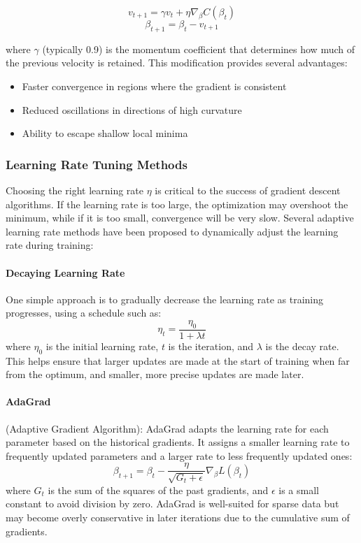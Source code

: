 \documentclass[aps,pra,english,notitlepage,reprint,nofootinbib]{revtex4-1}  %
\begin{document}
\begin{equation}
    v_{t+1} = \gamma v_t + \eta \nabla_\beta C(\beta_t)
\end{equation}
\begin{equation}
    \beta_{t+1} = \beta_t - v_{t+1}
\end{equation}

where \( \gamma \) (typically 0.9) is the momentum coefficient that determines how much of the previous velocity is retained. This modification provides several advantages:
\begin{itemize}
    \item Faster convergence in regions where the gradient is consistent
    \item Reduced oscillations in directions of high curvature
    \item Ability to escape shallow local minima
\end{itemize}

\subsubsection{Learning Rate Tuning Methods} \label{sec:learning_rate_tuning}

Choosing the right learning rate \( \eta \) is critical to the success of gradient descent algorithms. If the learning rate is too large, the optimization may overshoot the minimum, while if it is too small, convergence will be very slow. Several adaptive learning rate methods have been proposed to dynamically adjust the learning rate during training:

\paragraph*{Decaying Learning Rate}

 One simple approach is to gradually decrease the learning rate as training progresses, using a schedule such as:
  \[
  \eta_t = \frac{\eta_0}{1 + \lambda t}
  \]
  where \( \eta_0 \) is the initial learning rate, \( t \) is the iteration, and \( \lambda \) is the decay rate. This helps ensure that larger updates are made at the start of training when far from the optimum, and smaller, more precise updates are made later.

\paragraph*{AdaGrad}
 (Adaptive Gradient Algorithm): AdaGrad adapts the learning rate for each parameter based on the historical gradients. It assigns a smaller learning rate to frequently updated parameters and a larger rate to less frequently updated ones:
  \[
  \beta_{t+1} = \beta_t - \frac{\eta}{\sqrt{G_t + \epsilon}} \nabla_\beta L(\beta_t)
  \]
  where \( G_t \) is the sum of the squares of the past gradients, and \( \epsilon \) is a small constant to avoid division by zero. AdaGrad is well-suited for sparse data but may become overly conservative in later iterations due to the cumulative sum of gradients.
\end{document}
